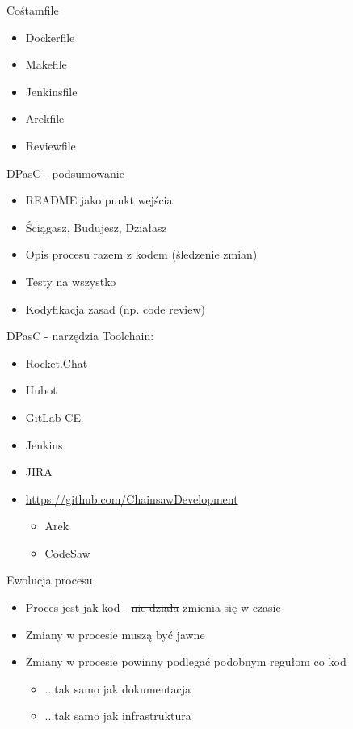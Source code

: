 \documentclass[ignorenonframetext]{beamer}
\begin{document}
\begin{frame}{Cośtamfile}
\begin{itemize}
	\item Dockerfile
	\item Makefile
	\item Jenkinsfile
	\item Arekfile
	\item Reviewfile
\end{itemize}
\end{frame}

\begin{frame}{DPasC - podsumowanie}
\begin{itemize}
	\item README jako punkt wejścia
	\item Ściągasz, Budujesz, Działasz	
	\item Opis procesu razem z kodem (śledzenie zmian)
	\item Testy na wszystko
	\item Kodyfikacja zasad (np. code review)
\end{itemize}
\end{frame}

\begin{frame}{DPasC - narzędzia}
Toolchain:
\begin{itemize}
	\item Rocket.Chat
	\item Hubot
	\item GitLab CE
	\item Jenkins
	\item JIRA
	\item \url{https://github.com/ChainsawDevelopment}
	\begin{itemize}
		\item Arek
		\item CodeSaw
	\end{itemize}
\end{itemize}

\end{frame}

\begin{frame}{Ewolucja procesu}
\begin{itemize}
	\item Proces jest jak kod - \sout{nie działa} zmienia się w czasie
	\item Zmiany w procesie muszą być jawne
	\item Zmiany w procesie powinny podlegać podobnym regułom co kod
		\begin{itemize}
			\item ...tak samo jak dokumentacja
			\item ...tak samo jak infrastruktura
		\end{itemize}
\end{itemize}
\end{frame}
\end{document}
